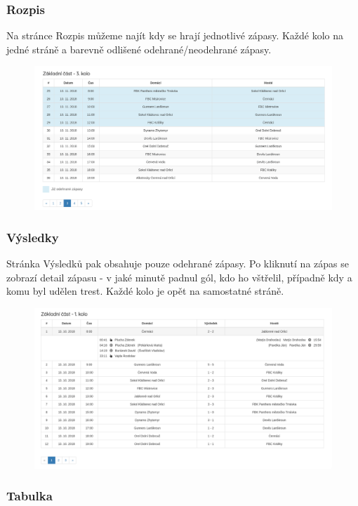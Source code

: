 \documentclass[11pt, a4paper, titlepage]{article}
\begin{document}
\subsubsection{Rozpis}

Na stránce Rozpis můžeme najít kdy se hrají jednotlivé zápasy. Každé kolo na jedné stráně a barevně odlišené odehrané/neodehrané zápasy.

\begin{figure}[H]
    \centering
    \includegraphics[width=.8\textwidth]{images/rozpis.png}\hfill
\end{figure}



\subsubsection{Výsledky}

Stránka Výsledků pak obsahuje pouze odehrané zápasy. Po kliknutí na zápas se zobrazí detail zápasu - v jaké minutě padnul gól, kdo ho vštřelil, případně kdy a komu byl udělen trest. Každé kolo je opět na samostatné stráně.

\begin{figure}[H]
    \centering
    \includegraphics[width=.8\textwidth]{images/vysledky.png}\hfill
\end{figure}



\subsubsection{Tabulka}
\end{document}

